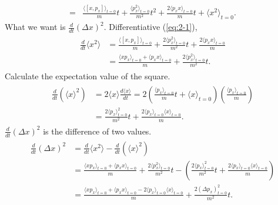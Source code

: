 \documentclass[floatfix,nofootinbib,superscriptaddress,fleqn]{revtex4-2}
\begin{document}
\begin{itemize}
\begin{align}
    =&\frac{\langle[x,p_x]\rangle_{t=0}}{m}t
    +\frac{\langle p_x^2\rangle_{t=0}}{m^2}t^2
    +\frac{2\langle p_xx\rangle_{t=0}}{m}t
    +\langle x^2\rangle_{t=0}.
  \end{align}
  What we want is $\frac{d}{dt}(\Delta x)^2 $. 
  Differentiative (\ref{eq:2-1}),
  \begin{align}
    \begin{split}
      \frac{d}{dt}\langle x^2\rangle 
      &=\frac{\langle[x,p_x]\rangle_{t=0}}{m}
      +\frac{2\langle p_x^2\rangle_{t=0}}{m^2}t
      +\frac{2\langle p_xx\rangle_{t=0}}{m} \\
      &=\frac{\langle xp_x\rangle_{t=0}+\langle p_xx\rangle_{t=0}}{m}
      +\frac{2\langle p_x^2\rangle_{t=0}}{m^2}t.
    \end{split}
  \end{align}
  Calculate the expectation value of the square.
  \begin{align}
    \begin{split}
      \frac{d}{dt}\left(\langle x \rangle^2\right) 
      &=2\langle x\rangle\frac{d\langle x\rangle}{dt}
      =2\left(\frac{\langle p_x\rangle_{t=0}}{m}t
      +\langle x\rangle_{t=0}\right)\left(
        \frac{\langle p_x\rangle_{t=0}}{m}\right)  \\
      &=\frac{2\langle p_x\rangle_{t=0}^2}{m^2}t
      +\frac{2\langle p_x\rangle_{t=0}\langle x\rangle_{t=0}}{m}.
    \end{split}
  \end{align}
  $\frac{d}{dt}(\Delta x)^2 $ is the difference of two values.
  \begin{align}
    \begin{split}
      \frac{d}{dt}(\Delta x)^2 
      &=\frac{d}{dt}\langle x^2 \rangle
      -\frac{d}{dt}\left(\langle x \rangle^2\right) \\
      &=\frac{\langle xp_x\rangle_{t=0}+\langle p_xx\rangle_{t=0}}{m}
      +\frac{2\langle p_x^2\rangle_{t=0}}{m^2}t
      -\left(\frac{2\langle p_x\rangle_{t=0}^2}{m^2}t
      +\frac{2\langle p_x\rangle_{t=0}\langle x\rangle_{t=0}}{m}
      \right) \\
      &=\frac{\langle xp_x\rangle_{t=0}+\langle p_xx\rangle_{t=0}
      -2\langle p_x\rangle_{t=0}\langle x\rangle_{t=0}}{m}
      +\frac{2\left(\Delta p_x\right)^2_{t=0}}{m^2}t.
    \end{split}
  \end{align}
\end{itemize} 
\vspace{0.5cm}
\end{document}
